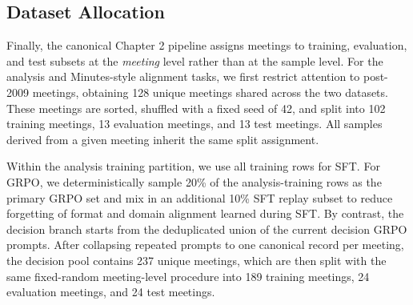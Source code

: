 

\subsection*{Dataset Allocation}


Finally, the canonical Chapter 2 pipeline assigns meetings to training, evaluation, and test subsets at the \textit{meeting} level rather than at the sample level. For the analysis and Minutes-style alignment tasks, we first restrict attention to post-2009 meetings, obtaining 128 unique meetings shared across the two datasets. These meetings are sorted, shuffled with a fixed seed of 42, and split into 102 training meetings, 13 evaluation meetings, and 13 test meetings. All samples derived from a given meeting inherit the same split assignment.

Within the analysis training partition, we use all training rows for SFT. For GRPO, we deterministically sample 20\% of the analysis-training rows as the primary GRPO set and mix in an additional 10\% SFT replay subset to reduce forgetting of format and domain alignment learned during SFT. By contrast, the decision branch starts from the deduplicated union of the current decision GRPO prompts. After collapsing repeated prompts to one canonical record per meeting, the decision pool contains 237 unique meetings, which are then split with the same fixed-random meeting-level procedure into 189 training meetings, 24 evaluation meetings, and 24 test meetings.


